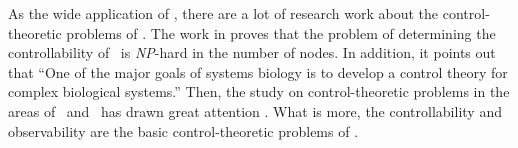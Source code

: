 


      

As the wide application of \BCNs, there are a lot of research work about the control-theoretic problems of \BCNs. The work in \cite{Akutsu2007Control} proves that the problem of determining the controllability of \BCNs\ is {\em NP}-hard in the number of nodes. In addition, it points out that ``One of the major goals of systems biology is to develop a control theory for complex biological systems.'' Then, the study on control-theoretic problems in the areas of \BNs\ and \BCNs\ has drawn great attention \cite{cheng2009controllability, Zhao2010Input, Cheng2011Identification, Cheng2011Analysis,Fornasini2013Observability}. What is more, the controllability and observability are the basic control-theoretic problems of \BCNs. %

